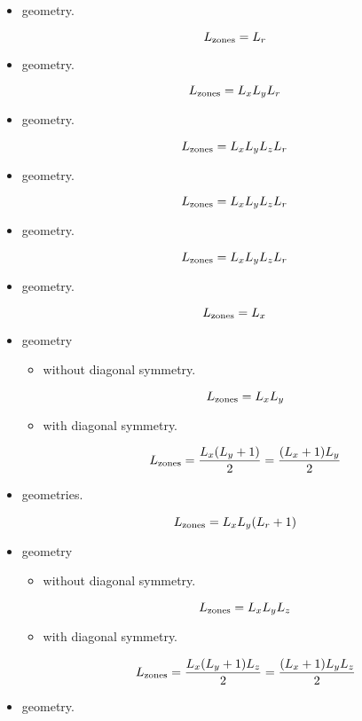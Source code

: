 \begin{itemize}

\item {} geometry.

$$L_{\rm{zones}}=L_r$$

\item {} geometry.

$$L_{\rm{zones}}= L_x L_y L_r $$

\item {} geometry.

$$L_{\rm{zones}}= L_x L_y L_z L_r$$

\item {} geometry.

$$L_{\rm{zones}}= L_x L_y L_z L_r$$

\item {} geometry.

$$L_{\rm{zones}}= L_x L_y L_z L_r$$

\item {} geometry.

$$L_{\rm{zones}}=L_x$$

\item {} geometry 
\begin{itemize}
\item without diagonal symmetry. 

$$L_{\rm{zones}}=L_x L_y$$

\item with diagonal symmetry. 

$$L_{\rm{zones}}=\frac{L_x (L_y+1)}{2}=\frac{(L_x+1) L_y}{2}$$
\end{itemize}

\item {} geometries.

$$L_{\rm{zones}}=L_x L_y (L_r+1) $$

\item {} geometry 
\begin{itemize}
\item without diagonal symmetry. 

$$L_{\rm{zones}}=L_x L_y L_z$$

\item with diagonal symmetry. 

$$L_{\rm{zones}}=\frac{L_x (L_y+1) L_z}{2}=\frac{(L_x+1) L_y L_z}{2}$$
\end{itemize}

\item {} geometry.


\end{itemize}
